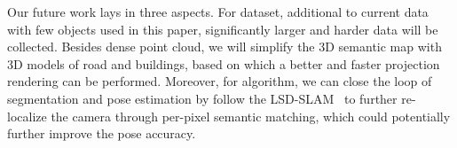 \documentclass[10pt,twocolumn,letterpaper]{article}
\begin{document}
Our future work lays in three aspects. For dataset, additional to current data with few objects used in this paper, significantly larger and harder data will be collected.
Besides dense point cloud, we will simplify the 3D semantic map with 3D models of road and buildings, based on which a better and faster projection rendering can be performed. 
Moreover, for algorithm, we can close the loop of segmentation and pose estimation by follow the LSD-SLAM~\cite{engel2014lsd} to further re-localize the camera through per-pixel semantic matching, which could potentially further improve the pose accuracy.



{\small


}
\end{document}
